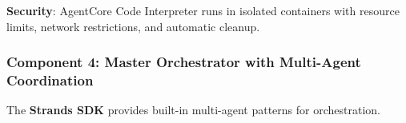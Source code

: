 \begin{Shaded}
\begin{Highlighting}[]
\SpecialCharTok{\{}\SpecialCharTok{\}}

\SpecialStringTok{        \textasciigrave{}\textasciigrave{}\textasciigrave{}}\SpecialCharTok{\{}\SpecialCharTok{\}}
\SpecialStringTok{        }\SpecialCharTok{\{}\SpecialCharTok{\}}
\SpecialStringTok{        \textasciigrave{}\textasciigrave{}\textasciigrave{}}

\NormalTok{)}
        \NormalTok{ \{}
            \NormalTok{: }  
\NormalTok{        \}}
\end{Highlighting}
\end{Shaded}

\textbf{Security}: AgentCore Code Interpreter runs in isolated
containers with resource limits, network restrictions, and automatic
cleanup.

\subsubsection{Component 4: Master Orchestrator with Multi-Agent
Coordination}\label{component-4-master-orchestrator-with-multi-agent-coordination}

The \textbf{Strands SDK} provides built-in multi-agent patterns for
orchestration.

